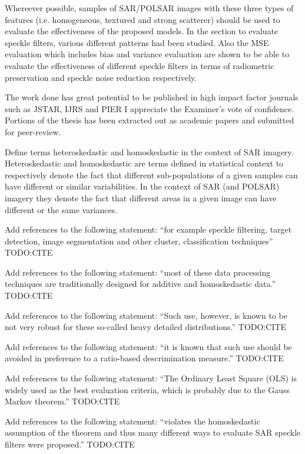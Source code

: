 \replyToComment
    {Whereever possible, samples of SAR/POLSAR images with these three types of features (i.e. homogeneous, textured and strong scatterer) should be used to evaluate the effectiveness of the proposed models.}
    {In the section to evaluate speckle filters, various different patterns had been studied. Also the MSE evaluation which includes bias and variance evaluation are shown to be able to evaluate the effectiveness of different speckle filters in terms of radiometric preservation and speckle noise reduction respectively.}
    
\replyToComment
    {The work done has great potential to be published in high impact factor journals such as JSTAR, IJRS and PIER}
    {I appreciate the Examiner's vote of confidence. Portions of the thesis has been extracted out as academic papers and submitted for peer-review.}    

\replyToComment
    {Define terms heteroskedastic and homoskedastic in the context of SAR imagery.}
    {Heteroskedastic and homoskedastic are terms defined in statistical context to respectively denote the fact that different sub-populations of a given samples can have different or similar variabilities. In the context of SAR (and POLSAR) imagery they denote the fact that different areas in a given image can have different or the same variances.}

\replyToComment
    {Add references to the following statement: ``for example speckle filtering, target detection, image segmentation and other cluster, classification techniques''}
    {TODO:CITE}

\replyToComment
    {Add references to the following statement: ``most of these data processing techniques are traditionally designed for additive and homoskedastic data.''}
    {TODO:CITE}

\replyToComment
    {Add references to the following statement: ``Such use, however, is known to be not very robust for these so-called heavy detailed distributions.''}
    {TODO:CITE}
    
\replyToComment
    {Add references to the following statement: ``it is known that such use should be avoided in preference to a ratio-based descrimination measure.''}
    {TODO:CITE}

\replyToComment
    {Add references to the following statement: ``The Ordinary Least Square (OLS) is widely used as the best evaluation criteria, which is probably due to the Gauss Markov theorem.''}
    {TODO:CITE}

\replyToComment
    {Add references to the following statement: ``violates the homoskedastic assumption of the theorem and thus many different ways to evaluate SAR speckle filters were proposed.''}
    {TODO:CITE}

